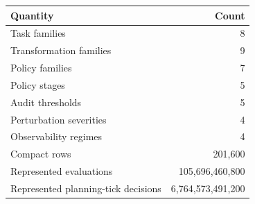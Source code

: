 \begin{tabular}{lr}
\toprule
Quantity & Count \\
\midrule
Task families & 8 \\
Transformation families & 9 \\
Policy families & 7 \\
Policy stages & 5 \\
Audit thresholds & 5 \\
Perturbation severities & 4 \\
Observability regimes & 4 \\
Compact rows & 201,600 \\
Represented evaluations & 105,696,460,800 \\
Represented planning-tick decisions & 6,764,573,491,200 \\
\bottomrule
\end{tabular}
